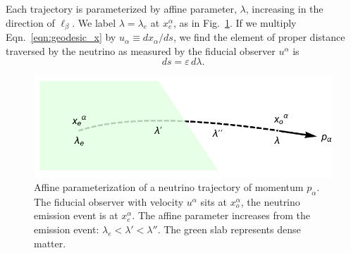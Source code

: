 \documentclass[aps,floatfix,prd,superscriptaddress,twocolumn]{revtex4-1}
\begin{document}
Each trajectory is parameterized by affine parameter, $\lambda$, increasing in
the direction of $\ell_\beta$. We label $\lambda=\lambda_e$ at $x^\alpha_e$,
as in Fig.~\ref{fig:affine_param}.
If we multiply Eqn.~\ref{eqn:geodesic_x} by $u_\alpha \equiv dx_\alpha/ds$,
we find the element of proper distance traversed by the
neutrino as measured by the fiducial observer $u^\alpha$ is
\begin{equation}
  \label{eqn:proper_length}
  ds=\varepsilon \,d\lambda.
\end{equation}

\begin{figure}
  \includegraphics[width=\columnwidth]{fig-affine_parameter_label}
  \caption{Affine parameterization of a neutrino trajectory of momentum
    $p_\alpha$.
    The fiducial observer with velocity $u^\alpha$ sits at $x^\alpha_o$,
    the neutrino emission event is at $x^\alpha_e$. The affine parameter
    increases from the emission event: $\lambda_e<\lambda'<\lambda''$.
    The green slab represents dense matter.}
  \label{fig:affine_param}
\end{figure}
\end{document}
